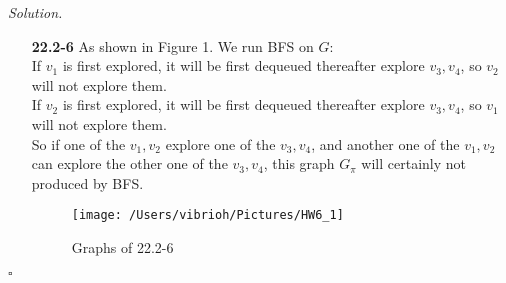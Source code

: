 \documentclass[11pt]{article}
\theoremstyle{definition}
\newenvironment{solution}{\noindent\emph{Solution.}}{\hfill$\square$}
\newcommand\tab[1][1cm]{\hspace*{#1}}
\begin{document}
\begin{solution}
\begin{enumerate}
    \item[\textbf{22.2-6}] As shown in Figure 1. We run BFS on $G$:\\
    \tab If $v_1$ is first explored, it will be first dequeued thereafter explore $v_3,v_4$, so $v_2$ will not explore them.\\
    \tab If $v_2$ is first explored, it will be first dequeued thereafter explore $v_3,v_4$, so $v_1$ will not explore them.\\
    \tab So if one of the $v_1, v_2$ explore one of the $v_3,v_4$, and another one of the $v_1,v_2$ can explore the other one of the $v_3,v_4$, this graph $G_{\pi}$ will certainly not produced by BFS.
    \begin{figure}[htbp]
  \centering
  \texttt{[image: /Users/vibrioh/Pictures/HW6\_1]}
  \caption{Graphs of 22.2-6}
  \label{fig:shapes}
\end{figure}
    



\end{enumerate}
\end{solution}
\end{document}

